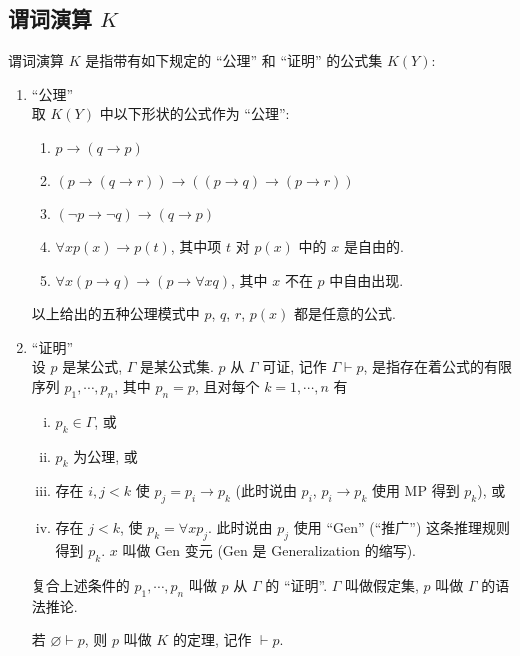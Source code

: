 \documentclass[
    color=black,
    device=normal,
    lang=cn
]{elegantnote}
\begin{document}
\subsection{谓词演算 \texorpdfstring{$K$}{K}}
\begin{definition}[谓词演算 $K$]
    谓词演算 $K$ 是指带有如下规定的 ``公理'' 和 ``证明'' 的公式集 $K(Y)$:
    \begin{enumerate}[label = $\arabic*^\circ$]
        \item ``公理''\\
              取 $K(Y)$ 中以下形状的公式作为 ``公理'':
              \begin{enumerate}[label = (K\arabic*)]
                  \item $p\to (q\to p)$
                  \item $(p\to (q\to r))\to ((p\to q)\to (p\to r))$
                  \item $(\lnot p\to \lnot q)\to (q\to p)$
                  \item $\forall xp(x)\to p(t)$, 其中项 $t$ 对 $p(x)$ 中的 $x$ 是自由的.
                  \item $\forall x(p\to q)\to (p\to \forall xq)$, 其中 $x$ 不在 $p$ 中自由出现.
              \end{enumerate}
              以上给出的五种公理模式中 $p$, $q$, $r$, $p(x)$ 都是任意的公式.
        \item ``证明''\\
              设 $p$ 是某公式, $\Gamma$ 是某公式集. $p$ 从 $\Gamma$ 可证, 记作 $\Gamma\vdash p$, 是指存在着公式的有限序列 $p_1, \cdots, p_n$, 其中 $p_n = p$, 且对每个 $k=1, \cdots, n$ 有
              \begin{enumerate}[(i)]
                  \item $p_k\in \Gamma$, 或
                  \item $p_k$ 为公理, 或
                  \item 存在 $i, j <k$ 使 $p_j=p_i\to p_k$ (此时说由 $p_i$, $p_i\to p_k$ 使用 MP 得到 $p_k$), 或
                  \item 存在 $j<k$, 使 $p_k = \forall xp_j$. 此时说由 $p_j$ 使用 ``Gen'' (``推广'') 这条推理规则得到 $p_k$. $x$ 叫做 Gen 变元 (Gen 是 Generalization 的缩写).
              \end{enumerate}
              复合上述条件的 $p_1, \cdots, p_n$ 叫做 $p$ 从 $\Gamma$ 的 ``证明''. $\Gamma$ 叫做假定集, $p$ 叫做 $\Gamma$ 的语法推论.

              若 $\varnothing\vdash p$, 则 $p$ 叫做 $K$ 的定理, 记作 $\vdash p$.
    \end{enumerate}
\end{definition}
\end{document}
